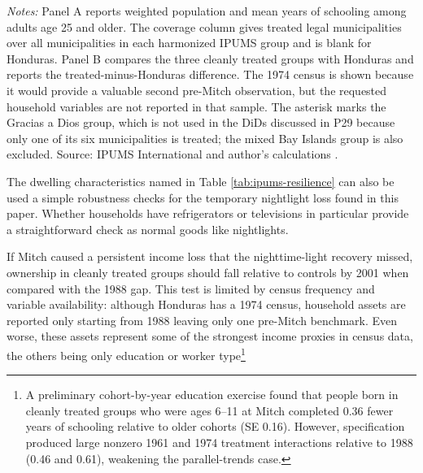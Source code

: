 \documentclass[12pt]{article}
\newcommand{\tablenotes}[1]{\vspace{0.3em}\begin{minipage}{0.92\linewidth}\footnotesize\emph{Notes:} #1\end{minipage}}
\begin{document}
\begin{table}[p]
\centering
\caption{\label{tab:ipums-resilience}Population, education, and dwelling conditions in Honduran 50-knot census groups}
\begingroup
\scriptsize
\setlength{\tabcolsep}{3pt}

\endgroup
\tablenotes{Panel A reports weighted population and mean years of schooling among adults age 25 and older. The coverage column gives treated legal municipalities over all municipalities in each harmonized IPUMS group and is blank for Honduras. Panel B compares the three cleanly treated groups with Honduras and reports the treated-minus-Honduras difference. The 1974 census is shown because it would provide a valuable second pre-Mitch observation, but the requested household variables are not reported in that sample. The asterisk marks the Gracias a Dios group, which is not used in the DiDs discussed in P29 because only one of its six municipalities is treated; the mixed Bay Islands group is also excluded. Source: IPUMS International and author's calculations \parencite{ipumsinternational2025}.}
\end{table}

The dwelling characteristics named in Table \ref{tab:ipums-resilience} can also be used a simple robustness checks for the temporary nightlight loss found in this paper. Whether households have refrigerators or televisions in particular provide a straightforward check as normal goods like nightlights. 

 If Mitch caused a persistent income loss that the nighttime-light recovery missed, ownership in cleanly treated groups should fall relative to controls by 2001 when compared with the 1988 gap. This test is limited by census frequency and variable availability: although Honduras has a 1974 census, household assets are reported only starting from 1988 leaving only one pre-Mitch benchmark. Even worse, these assets represent some of the strongest income proxies in census data, the others being only education or worker type\footnote{A preliminary cohort-by-year education exercise found that people born in cleanly treated groups who were ages 6--11 at Mitch completed 0.36 fewer years of schooling relative to older cohorts (SE 0.16). However, specification produced large nonzero 1961 and 1974 treatment interactions relative to 1988 (0.46 and 0.61), weakening the parallel-trends case.}
\end{document}
